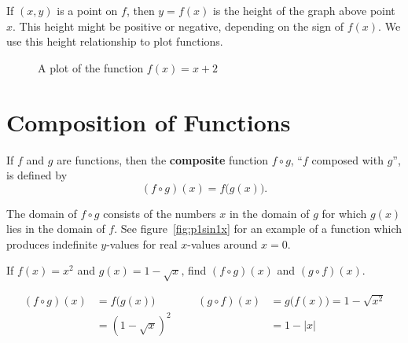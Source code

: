If \( (x,y) \) is a point on \(f\), then \(y=f(x)\) is the height of the graph above point \(x\).
This height might be positive or negative, depending on the sign of \(f(x)\).
We use this height relationship to plot functions.
\begin{figure}[H]
    \begin{center}
      \caption{A plot of the function \(f(x)=x+2\)}
    \end{center}
  \end{figure}

\section{Composition of Functions}
\label{sec:compositefunctions}
\begin{defn}
  If \(f\) and \(g\) are functions, then the \textbf{composite} function \(f \circ g\), ``\(f\) composed with \(g\)'', is defined by
  \[ (f \circ g)(x)=f\bigl(g(x)\bigr) \text{.} \]
  \begin{remark}
    The domain of \( f \circ g \) consists of the numbers \(x\) in the domain of \(g\) for which \(g(x)\) lies in the domain of \(f\).
    See figure~\ref{fig:p1sin1x} for an example of a function which produces indefinite $y$-values for real $x$-values around $x=0$.
  \end{remark}
\end{defn}
\begin{ex}
  If
  \(f(x)=x^2\)
  and
  \(g(x)=1-\sqrt{x}\text{,}\)
  find \( (f \circ g)(x) \) and \( (g \circ f)(x)\).
  \begin{sol}
    \begin{align*}
      (f \circ g)(x)
      &=f\big(g(x)\big)
      &&&
      (g \circ f)(x)
      &=g\big(f(x)\big)=1-\sqrt{x^2}
      \\
      &=(1-\sqrt{x})^2
      &&&
      &= 1-|x|
    \end{align*}
  \end{sol}
\end{ex}

